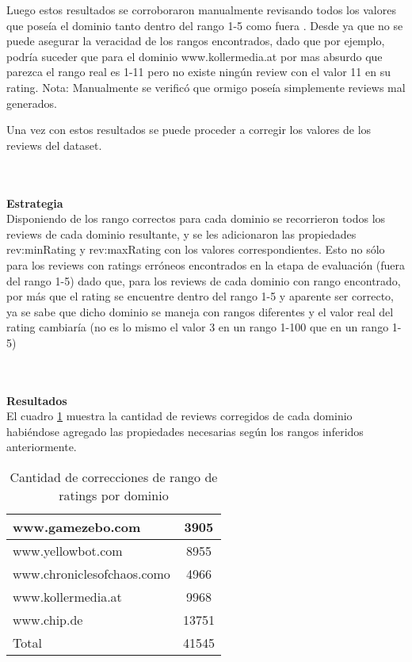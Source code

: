 Luego estos resultados se corroboraron manualmente revisando todos los valores que poseía el dominio tanto dentro del rango 1-5 como fuera .
Desde ya que no se puede asegurar la veracidad de los rangos encontrados, dado que por ejemplo, podría suceder que para el dominio 
www.kollermedia.at por mas absurdo que parezca el rango real es 1-11 pero no existe ningún review con el valor 11 en su rating.
Nota: Manualmente se verificó que ormigo poseía simplemente reviews mal generados.

Una vez con estos resultados se puede proceder a corregir los valores de los reviews del dataset.

~\\\\\textbf{Estrategia}\\
Disponiendo de los rango correctos para cada dominio se recorrieron todos los reviews de cada dominio resultante, y se les adicionaron 
las propiedades rev:minRating y rev:maxRating con los valores correspondientes.
Esto no sólo para los reviews con ratings erróneos encontrados en la etapa de evaluación (fuera del rango 1-5) dado que, para los reviews de 
cada dominio con rango encontrado, por más que el rating se encuentre dentro del rango 1-5 y aparente ser correcto,  ya se sabe que dicho dominio se 
maneja con rangos diferentes y el valor real del rating cambiaría (no es lo mismo el valor 3 en un rango 1-100 que en un rango 1-5)

~\\\\\textbf{Resultados}\\
El cuadro \ref{table:DomainRangeCorrections} muestra la cantidad de reviews corregidos de cada dominio habiéndose agregado las 
propiedades necesarias según los rangos inferidos anteriormente.
\begin{table}[h]
\begin{tabular}{| l | c |}\hline
 www.gamezebo.com & 3905\\\hline
 www.yellowbot.com & 8955\\
 www.chroniclesofchaos.como & 4966\\
 www.kollermedia.at & 9968\\
 www.chip.de & 13751\\\hline
 Total & 41545\\\hline
\end{tabular}
\caption{Cantidad de correcciones de rango de ratings por dominio}
\label{table:DomainRangeCorrections}
\end{table}\\
\\
